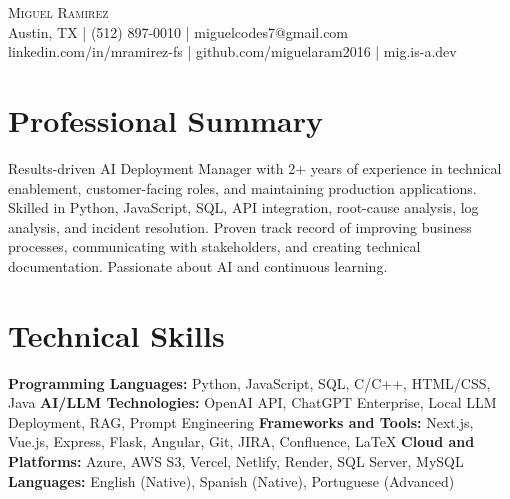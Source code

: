 \documentclass[letterpaper,10pt]{article}
\begin{document}
\begin{center}
  {\Large \scshape Miguel Ramirez} \\ \vspace{0pt}
  Austin, TX | (512) 897-0010 | miguelcodes7@gmail.com \\ 
  linkedin.com/in/mramirez-fs | github.com/miguelaram2016 | mig.is-a.dev
\end{center}

\section*{Professional Summary}
Results-driven AI Deployment Manager with 2+ years of experience in technical enablement, customer-facing roles, and maintaining production applications. Skilled in Python, JavaScript, SQL, API integration, root-cause analysis, log analysis, and incident resolution. Proven track record of improving business processes, communicating with stakeholders, and creating technical documentation. Passionate about AI and continuous learning.

\section*{Technical Skills}
\textbf{Programming Languages:} Python, JavaScript, SQL, C/C++, HTML/CSS, Java \newline
\textbf{AI/LLM Technologies:} OpenAI API, ChatGPT Enterprise, Local LLM Deployment, RAG, Prompt Engineering \newline
\textbf{Frameworks and Tools:} Next.js, Vue.js, Express, Flask, Angular, Git, JIRA, Confluence, LaTeX \newline
\textbf{Cloud and Platforms:} Azure, AWS S3, Vercel, Netlify, Render, SQL Server, MySQL \newline
\textbf{Languages:} English (Native), Spanish (Native), Portuguese (Advanced)

\end{document}
